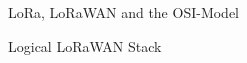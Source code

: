 \begin{frame}{LoRa, LoRaWAN and the OSI-Model}
  \begin{center}
    Logical LoRaWAN Stack\\
  \end{center}
\end{frame}
